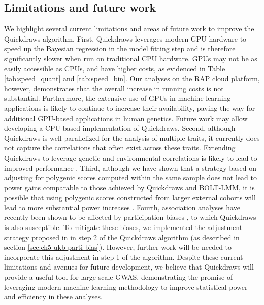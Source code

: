 \subsection{Limitations and future work}

We highlight several current limitations and areas of future work to improve the Quickdraws algorithm.
%
First, Quickdraws leverages modern GPU hardware to speed up the Bayesian regression in the model fitting step and is therefore significantly slower when run on traditional CPU hardware.
%
GPUs may not be as easily accessible as CPUs, and have higher costs, as evidenced in Table \ref{tab:speed_quant} and \ref{tab:speed_bin}.
%
Our analyses on the RAP cloud platform, however, demonstrates that the overall increase in running costs is not substantial.
%
Furthermore, the extensive use of GPUs in machine learning applications is likely to continue to increase their availability, paving the way for additional GPU-based applications in human genetics.
%
Future work may allow developing a CPU-based implementation of Quickdraws.
%
Second, although Quickdraws is well parallelized for the analysis of multiple traits, it currently does not capture the correlations that often exist across these traits.
%
Extending Quickdraws to leverage genetic and environmental correlations is likely to lead to improved performance \cite{korte2012mixed,zhou2014efficient}.
%
%
Third, although we have shown that a strategy based on adjusting for polygenic scores computed within the same sample does not lead to power gains comparable to those achieved by Quickdraws and BOLT-LMM, it is possible that using polygenic scores constructed from larger external cohorts will lead to more substantial power increases \cite{campos2023boosting, jurgens2023adjusting}.
%
Fourth, association analyses have recently been shown to be affected by participation biases \cite{pirastu2021genetic, benonisdottir2023studying}, to which Quickdraws is also susceptible.
%
To mitigate these biases, we implemented the adjustment strategy proposed in \cite{schoeler2023participation} in step 2 of the Quickdraws algorithm (as described in section \ref{sec:ch5-ukb-parti-bias}).
%
However, further work will be needed to incorporate this adjustment in step 1 of the algorithm.
%
Despite these current limitations and avenues for future development, we believe that Quickdraws will provide a useful tool for large-scale GWAS, demonstrating the promise of leveraging modern machine learning methodology to improve statistical power and efficiency in these analyses.
